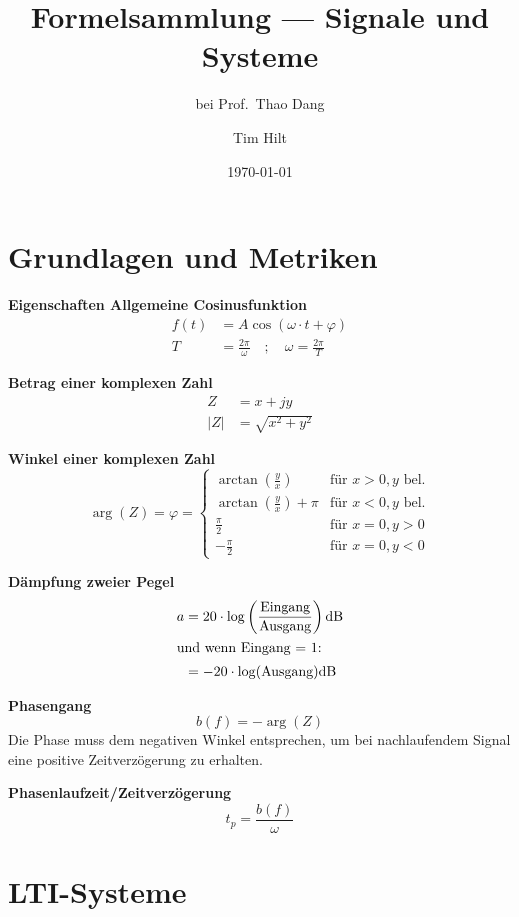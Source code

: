 \documentclass[12pt, a4paper, twoside]{scrartcl}
\title{Formelsammlung --- Signale und Systeme}
\subtitle{bei Prof.\ Thao Dang}
\author{Tim Hilt}
\date{\today}
\begin{document}
\maketitle
\tableofcontents
\clearpage

\section{Grundlagen und Metriken}

\textbf{Eigenschaften Allgemeine Cosinusfunktion}
\begin{align*}
  f(t) &= A\cos(\omega \cdot t + \varphi)\\
  T &= \frac{2\pi}{\omega} \quad ; \quad \omega = \frac{2\pi}{T}
\end{align*}

\textbf{Betrag einer komplexen Zahl}
\begin{align*}
  Z &= x+ jy\\
  |Z| &= \sqrt{x^2 +y^2}
\end{align*}

\textbf{Winkel einer komplexen Zahl}
\[\arg (Z) = \varphi =
  \begin{cases}
    \arctan \left(\frac{y}{x}\right) & \text{für } x>0, y \text{ bel.}\\
    \arctan \left(\frac{y}{x}\right) + \pi & \text{für } x<0, y \text{ bel.}\\
    \frac{\pi}{2} & \text{für } x = 0, y > 0\\
    - \frac{\pi}{2} & \text{für } x = 0,y < 0
  \end{cases}\]

\textbf{Dämpfung zweier Pegel}
\begin{align*}
  a &= 20 \cdot \log \left(\frac{\text{Eingang}}{\text{Ausgang}} \right) \si{\decibel}\\
  \intertext{und wenn Eingang = 1:}
  &= -20 \cdot \log(\textrm{Ausgang}) \si{\decibel}
\end{align*}

\textbf{Phasengang}
\[b(f) = -\arg(Z)\]
Die Phase muss dem negativen Winkel entsprechen, um bei nachlaufendem Signal eine positive Zeitverzögerung zu erhalten.

\textbf{Phasenlaufzeit/Zeitverzögerung}
\[t_p = \frac{b(f)}{\omega}\]

\clearpage
\section{LTI-Systeme}
\end{document}
